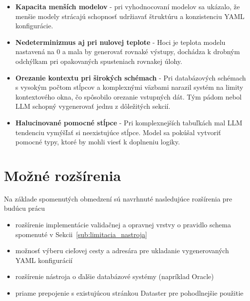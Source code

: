 \begin{itemize}
    \item \textbf{Kapacita menších modelov} - 
    pri vyhodnocovaní modelov sa ukázalo, že menšie modely strácajú schopnosť udržiavať štruktúru a konzistenciu YAML konfigurácie.
    
    \item \textbf{Nedeterminizmus aj pri nulovej teplote} -
    Hoci je teplota modelu nastavená na 0 a mala by generovať rovnaké výstupy, dochádza k drobným odchýlkam pri opakovaných spusteniach rovnakej úlohy.

    \item \textbf{Orezanie kontextu pri širokých schémach} -
    Pri databázových schémach s vysokým počtom stĺpcov a komplexnými väzbami narazil systém na limity kontextového okna, čo spôsobilo orezanie vstupných dát. Tým pádom nebol LLM schopný vygenerovať jednu z dôležitých sekcií.

    \item \textbf{Halucinované pomocné stĺpce} -
    Pri komplexnejších tabuľkách mal LLM tendenciu vymýšľať si neexistujúce stĺpce. Model sa pokúšal vytvoriť pomocné typy, ktoré by mohli viesť k doplneniu logiky.
\end{itemize}

\section{Možné rozšírenia}
\label{sub:mozne_rozsirenia}
Na základe spomenutých obmedzení sú navrhnuté nasledujúce rozšírenia pre budúcu prácu
\begin{itemize}
    \item rozšírenie implementácie validačnej a opravnej vrstvy o pravidlo schema spomenuté v Sekcii~\ref{sub:limitacia_nastroja}
    \item možnosť výberu cieľovej cesty a adresára pre ukladanie vygenerovaných YAML konfigurácií
    \item rozšírenie nástroja o ďalšie databázové systémy (napríklad Oracle) 
    \item priame prepojenie s existujúcou stránkou Dataster pre pohodlnejšie použitie

\end{itemize}

